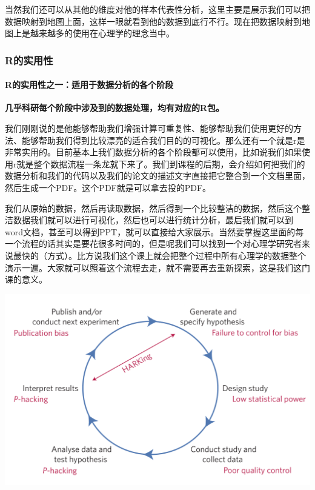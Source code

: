 \documentclass[
  oneside]{book}
\begin{document}
当然我们还可以从其他的维度对他的样本代表性分析，这里主要是展示我们可以把数据映射到地图上面，这样一眼就看到他的数据到底行不行。现在把数据映射到地图上是越来越多的使用在心理学的理念当中。

\hypertarget{rux7684ux5b9eux7528ux6027}{%
\subsubsection{R的实用性}\label{rux7684ux5b9eux7528ux6027}}

\hypertarget{rux7684ux5b9eux7528ux6027ux4e4bux4e00ux9002ux7528ux4e8eux6570ux636eux5206ux6790ux7684ux5404ux4e2aux9636ux6bb5}{%
\paragraph{R的实用性之一：适用于数据分析的各个阶段}\label{rux7684ux5b9eux7528ux6027ux4e4bux4e00ux9002ux7528ux4e8eux6570ux636eux5206ux6790ux7684ux5404ux4e2aux9636ux6bb5}}

\textbf{几乎科研每个阶段中涉及到的数据处理，均有对应的R包。}

我们刚刚说的是他能够帮助我们增强计算可重复性、能够帮助我们使用更好的方法、能够帮助我们得到比较漂亮的适合我们目的的可视化。那么还有一个就是r是非常实用的。目前基本上我们数据分析的各个阶段都可以使用，比如说我们如果使用r就是整个数据流程一条龙就下来了。我们到课程的后期，会介绍如何把我们的数据分析和我们的代码以及我们的论文的描述文字直接把它整合到一个文档里面，然后生成一个PDF。这个PDF就是可以拿去投的PDF。

我们从原始的数据，然后再读取数据，然后得到一个比较整洁的数据，然后这个整洁数据我们就可以进行可视化，然后也可以进行统计分析，最后我们就可以到word文档，甚至可以得到PPT，就可以直接给大家展示。当然要掌握这里面的每一个流程的话其实是要花很多时间的，但是呢我们可以找到一个对心理学研究者来说最快的（方式）。比方说我们这个课上就会把整个过程中所有心理学的数据整个演示一遍。大家就可以照着这个流程去走，就不需要再去重新探索，这是我们这门课的意义。

\includegraphics{1001-lesson1/image-20230302200230583.png}
\end{document}
